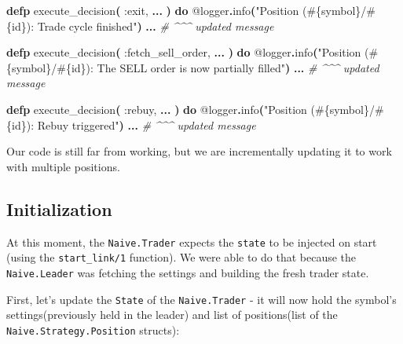 \documentclass[
  oneside]{book}
\newenvironment{Shaded}{\begin{snugshade}}{\end{snugshade}}
\newcommand{\CommentTok}[1]{\textcolor[rgb]{0.56,0.35,0.01}{\textit{#1}}}
\newcommand{\FunctionTok}[1]{\textcolor[rgb]{0.13,0.29,0.53}{\textbf{#1}}}
\newcommand{\KeywordTok}[1]{\textcolor[rgb]{0.13,0.29,0.53}{\textbf{#1}}}
\newcommand{\NormalTok}[1]{#1}
\newcommand{\OperatorTok}[1]{\textcolor[rgb]{0.81,0.36,0.00}{\textbf{#1}}}
\newcommand{\OtherTok}[1]{\textcolor[rgb]{0.56,0.35,0.01}{#1}}
\newcommand{\StringTok}[1]{\textcolor[rgb]{0.31,0.60,0.02}{#1}}
\newcommand{\VariableTok}[1]{\textcolor[rgb]{0.00,0.00,0.00}{#1}}
\begin{document}
\begin{Shaded}
\begin{Highlighting}[]
  \KeywordTok{defp}\NormalTok{ execute\_decision}\FunctionTok{(}
         \VariableTok{:exit}\NormalTok{,}
         \OperatorTok{...}
       \FunctionTok{)} \KeywordTok{do}
    \OtherTok{@logger}\OperatorTok{.}\NormalTok{info}\FunctionTok{(}\StringTok{"Position (}\OtherTok{\#\{}\NormalTok{symbol}\OtherTok{\}}\StringTok{/}\OtherTok{\#\{}\NormalTok{id}\OtherTok{\}}\StringTok{): Trade cycle finished"}\FunctionTok{)}
    \OperatorTok{...} \CommentTok{\# \^{}\^{}\^{} updated message}

  \KeywordTok{defp}\NormalTok{ execute\_decision}\FunctionTok{(}
         \VariableTok{:fetch\_sell\_order}\NormalTok{,}
         \OperatorTok{...}
       \FunctionTok{)} \KeywordTok{do}
    \OtherTok{@logger}\OperatorTok{.}\NormalTok{info}\FunctionTok{(}\StringTok{"Position (}\OtherTok{\#\{}\NormalTok{symbol}\OtherTok{\}}\StringTok{/}\OtherTok{\#\{}\NormalTok{id}\OtherTok{\}}\StringTok{): The SELL order is now partially filled"}\FunctionTok{)}
     \OperatorTok{...} \CommentTok{\# \^{}\^{}\^{} updated message}

  \KeywordTok{defp}\NormalTok{ execute\_decision}\FunctionTok{(}
         \VariableTok{:rebuy}\NormalTok{,}
         \OperatorTok{...}
       \FunctionTok{)} \KeywordTok{do}
    \OtherTok{@logger}\OperatorTok{.}\NormalTok{info}\FunctionTok{(}\StringTok{"Position (}\OtherTok{\#\{}\NormalTok{symbol}\OtherTok{\}}\StringTok{/}\OtherTok{\#\{}\NormalTok{id}\OtherTok{\}}\StringTok{): Rebuy triggered"}\FunctionTok{)}
     \OperatorTok{...} \CommentTok{\# \^{}\^{}\^{} updated message}
\end{Highlighting}
\end{Shaded}

Our code is still far from working, but we are incrementally updating it to work with multiple positions.

\subsection{Initialization}\label{initialization}

At this moment, the \texttt{Naive.Trader} expects the \texttt{state} to be injected on start (using the \texttt{start\_link/1} function). We were able to do that because the \texttt{Naive.Leader} was fetching the settings and building the fresh trader state.

First, let's update the \texttt{State} of the \texttt{Naive.Trader} - it will now hold the symbol's settings(previously held in the leader) and list of positions(list of the \texttt{Naive.Strategy.Position} structs):
\end{document}
